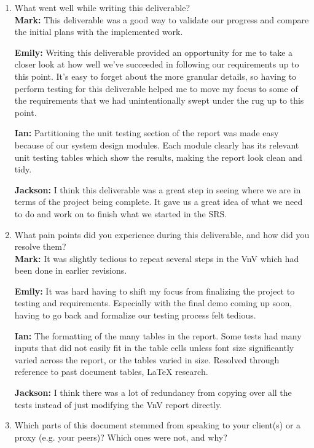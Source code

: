 \documentclass[12pt, titlepage]{article}
\begin{document}
\begin{enumerate}
  \item What went well while writing this deliverable? \\
  \textbf{Mark:} This deliverable was a good way to validate our progress and compare the initial plans with the implemented work.

  \textbf{Emily:} Writing this deliverable provided an opportunity for me to take a closer look at how well we’ve succeeded in 
  following our requirements up to this point. It’s easy to forget about the more granular details, so having to perform testing 
  for this deliverable helped me to move my focus to some of the requirements that we had unintentionally swept under the rug up
   to this point.

  \textbf{Ian:} Partitioning the unit testing section of the report was made easy because of our system design modules. Each 
  module clearly has its relevant unit testing tables which show the results, making the report look clean and tidy.

  \textbf{Jackson:} I think this deliverable was a great step in seeing where we are in terms of the project being complete. 
  It gave us a great idea of what we need to do and work on to finish what we started in the SRS.

  \item What pain points did you experience during this deliverable, and how
    did you resolve them?\\
  \textbf{Mark:} It was slightly tedious to repeat several steps in the VnV which had been done in earlier revisions.

  \textbf{Emily:} It was hard having to shift my focus from finalizing the project to testing and requirements. Especially with 
  the final demo coming up soon, having to go back and formalize our testing process felt tedious.

  \textbf{Ian:} The formatting of the many tables in the report. Some tests had many inputs that did not easily fit in the 
  table cells unless font size significantly varied across the report, or the tables varied in size. Resolved through reference to 
  past document tables, LaTeX research.

  \textbf{Jackson:} I think there was a lot of redundancy from copying over all the tests instead of just modifying the VnV report directly.

  \item Which parts of this document stemmed from speaking to your client(s) or
  a proxy (e.g. your peers)? Which ones were not, and why?


\end{enumerate}
\end{document}
